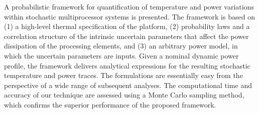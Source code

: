 A probabilistic framework for quantification of temperature and power variations within stochastic multiprocessor systems is presented. The framework is based on (1) a high-level thermal specification of the platform, (2) probability laws and a correlation structure of the intrinsic uncertain parameters that affect the power dissipation of the processing elements, and (3) an arbitrary power model, in which the uncertain parameters are inputs. Given a nominal dynamic power profile, the framework delivers analytical expressions for the resulting stochastic temperature and power traces. The formulations are essentially easy from the perspective of a wide range of subsequent analyses. The computational time and accuracy of our technique are assessed using a Monte Carlo sampling method, which confirms the superior performance of the proposed framework.
